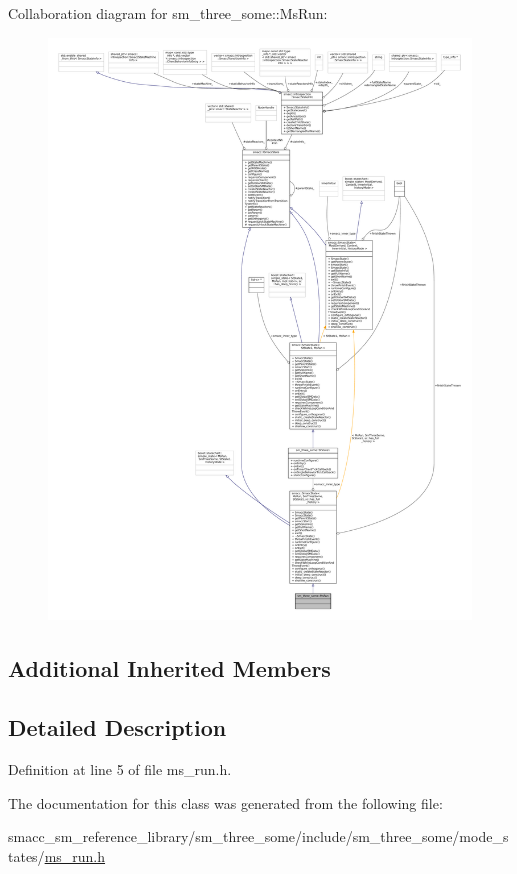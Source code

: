 Collaboration diagram for sm\+\_\+three\+\_\+some\+:\+:Ms\+Run\+:
\nopagebreak
\begin{figure}[H]
\begin{center}
\leavevmode
\includegraphics[width=350pt]{classsm__three__some_1_1MsRun__coll__graph}
\end{center}
\end{figure}
\subsection*{Additional Inherited Members}


\subsection{Detailed Description}


Definition at line 5 of file ms\+\_\+run.\+h.



The documentation for this class was generated from the following file\+:\begin{DoxyCompactItemize}
\item 
smacc\+\_\+sm\+\_\+reference\+\_\+library/sm\+\_\+three\+\_\+some/include/sm\+\_\+three\+\_\+some/mode\+\_\+states/\hyperlink{sm__three__some_2include_2sm__three__some_2mode__states_2ms__run_8h}{ms\+\_\+run.\+h}\end{DoxyCompactItemize}
